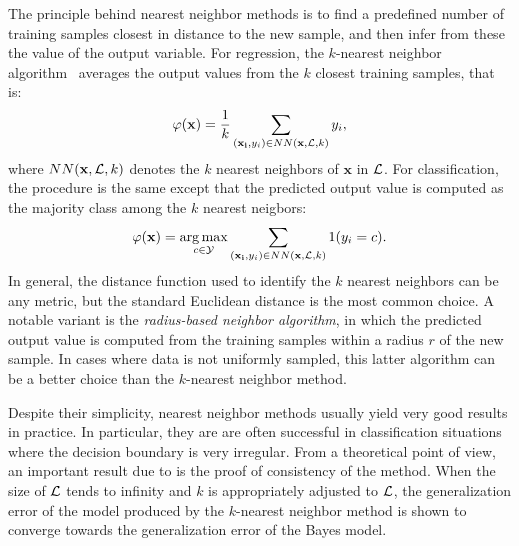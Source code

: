 The principle behind nearest neighbor methods is to find a predefined number of
training samples closest in distance to the new sample, and then infer from
these the value of the output variable. For regression, the $k$-nearest
neighbor algorithm~\citep{fix:1951} averages the output values from the $k$
closest training samples, that is:
\begin{equation}
\varphi(\mathbf{x}) = \frac{1}{k} \sum_{(\mathbf{x_i}, y_i) \in NN(\mathbf{x}, {\cal L}, k)} y_i,
\end{equation}
where $NN(\mathbf{x}, {\cal L}, k)$ denotes the $k$ nearest neighbors of ${\mathbf{x}}$ in ${\cal L}$.
For classification, the procedure is the same except that the predicted
output value is computed as the majority class among the $k$ nearest neigbors:
\begin{equation}
\varphi(\mathbf{x}) = \operatorname*{arg\,max}_{c \in {\cal Y}} \sum_{(\mathbf{x_i}, y_i) \in NN(\mathbf{x}, {\cal L}, k)} 1(y_i = c).
\end{equation}
In general, the distance function used to identify the $k$ nearest neighbors
can be any metric, but the standard Euclidean distance is the most common
choice. A notable variant is the
\textit{radius-based neighbor algorithm}, in which the predicted output value
is computed from the training samples within a radius $r$ of the new sample.
In cases where data is not uniformly sampled, this latter algorithm can be
a better choice than the $k$-nearest neighbor method.

Despite their simplicity, nearest neighbor methods usually yield very good
results in practice. In particular, they are are often successful in
classification situations where the decision boundary is very irregular. From a
theoretical point of view, an important result due to \citet{cover:1967} is the
proof of consistency of the method. When the size of ${\cal L}$ tends to
infinity and $k$ is appropriately adjusted to ${\cal L}$, the generalization
error of the model produced by the $k$-nearest neighbor method is shown to
converge towards the generalization error of the Bayes model.
